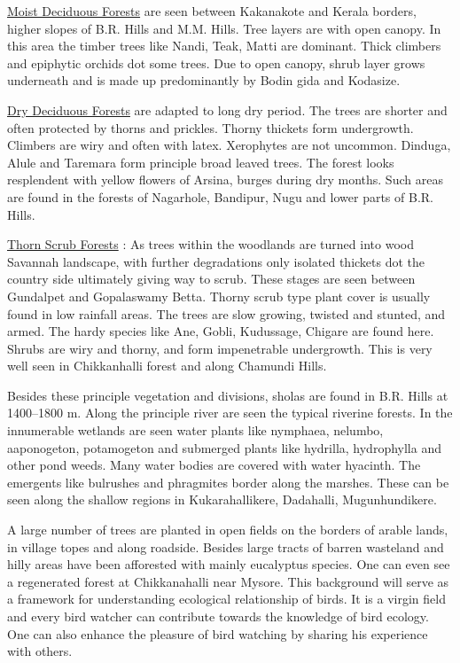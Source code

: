 \underline{Moist Deciduous Forests} are seen between Kakanakote and
Kerala borders, higher slopes of B.R. Hills and M.M. Hills. Tree 
layers are with open canopy. In this area the timber trees like 
Nandi, Teak, Matti are dominant. Thick climbers and epiphytic 
orchids dot some trees. Due to open canopy, shrub layer grows 
underneath and is made up predominantly by Bodin gida and Kodasize. 

\underline{Dry Deciduous Forests} are adapted to long dry period. The 
trees are shorter and often protected by thorns and prickles. 
Thorny thickets form undergrowth. Climbers are wiry and often 
with latex. Xerophytes are not uncommon. Dinduga, Alule and 
Taremara form principle broad leaved trees. The forest looks 
resplendent with yellow flowers of Arsina, burges during dry 
months. Such areas are found in the forests of Nagarhole, Bandipur, 
Nugu and lower parts of B.R. Hills. 

\underline{Thorn Scrub Forests} : As trees within the woodlands are turned 
into wood Savannah landscape, with further degradations only isolated 
thickets dot the country side ultimately giving way to 
scrub. These stages are seen between Gundalpet and Gopalaswamy 
Betta. Thorny scrub type plant cover is usually found in low 
rainfall areas. The trees are slow growing, twisted and stunted, 
and armed. The hardy species like Ane, Gobli, Kudussage, Chigare 
are found here. Shrubs are wiry and thorny, and form impenetrable 
undergrowth. This is very well seen in Chikkanhalli forest and 
along Chamundi Hills. 

Besides these principle vegetation and divisions, sholas are 
found in B.R. Hills at 1400--1800 m. Along the principle river 
are seen the typical riverine forests. In the innumerable wetlands 
are seen water plants like nymphaea, nelumbo, aaponogeton, 
potamogeton and submerged plants like hydrilla, hydrophylla and 
other pond weeds. Many water bodies are covered with water hyacinth. 
The emergents like bulrushes and phragmites border along 
the marshes. These can be seen along the shallow regions in 
Kukarahallikere, Dadahalli, Mugunhundikere. 

A large number of trees are planted in open fields on the 
borders of arable lands, in village topes and along roadside. Besides 
large tracts of barren wasteland and hilly areas have been 
afforested with mainly eucalyptus species. One can even see a 
regenerated forest at Chikkanahalli near Mysore. This background 
will serve as a framework for understanding ecological relationship 
of birds. It is a virgin field and every bird watcher can 
contribute towards the knowledge of bird ecology. One can also 
enhance the pleasure of bird watching by sharing his experience 
with others. 

